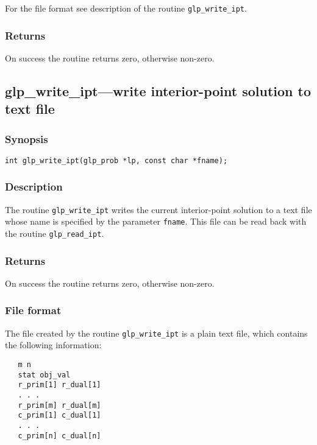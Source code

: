 For the file format see description of the routine \verb|glp_write_ipt|.

\subsubsection*{Returns}

On success the routine returns zero, otherwise non-zero.

\pagebreak

\subsection{glp\_write\_ipt---write interior-point solution to text
file}

\subsubsection*{Synopsis}

\begin{verbatim}
int glp_write_ipt(glp_prob *lp, const char *fname);
\end{verbatim}

\subsubsection*{Description}

The routine \verb|glp_write_ipt| writes the current interior-point
solution to a text file whose name is specified by the parameter
\verb|fname|. This file can be read back with the routine
\verb|glp_read_ipt|.

\subsubsection*{Returns}

On success the routine returns zero, otherwise non-zero.

\subsubsection*{File format}

The file created by the routine \verb|glp_write_ipt| is a plain text
file, which contains the following information:

\begin{verbatim}
   m n
   stat obj_val
   r_prim[1] r_dual[1]
   . . .
   r_prim[m] r_dual[m]
   c_prim[1] c_dual[1]
   . . .
   c_prim[n] c_dual[n]
\end{verbatim}

